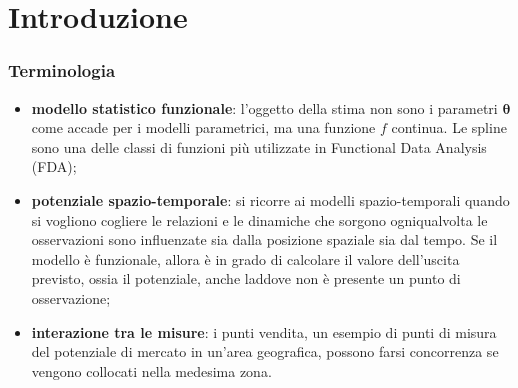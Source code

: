 \section{Introduzione}

\begin{frame}
	\frametitle{Terminologia}
	\centering
	
	\begin{itemize}
		\justifying
		\item \textbf{modello statistico funzionale}: l'oggetto della stima non sono i parametri $\boldsymbol{\theta}$ come accade per i modelli parametrici, ma una funzione $f$ continua. Le spline sono una delle classi di funzioni più utilizzate in Functional Data Analysis (FDA);
		\item \textbf{potenziale spazio-temporale}: si ricorre ai modelli spazio-temporali quando si vogliono cogliere le relazioni e le dinamiche che sorgono ogniqualvolta le osservazioni sono influenzate sia dalla posizione spaziale sia dal tempo. Se il modello è funzionale, allora è in grado di calcolare il valore dell'uscita previsto, ossia il potenziale, anche laddove non è presente un punto di osservazione;
		\item \textbf{interazione tra le misure}: i punti vendita, un esempio di punti di misura del potenziale di mercato in un'area geografica, possono farsi concorrenza se vengono collocati nella medesima zona.
	\end{itemize}
	
\end{frame}

